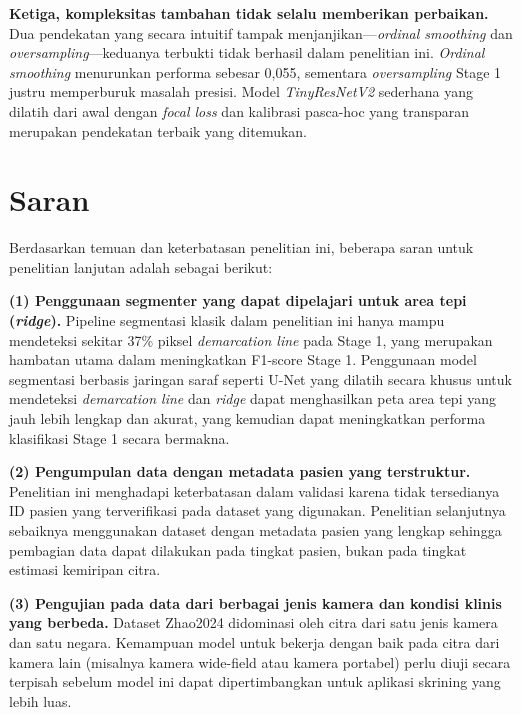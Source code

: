 \textbf{Ketiga, kompleksitas tambahan tidak selalu memberikan perbaikan.} Dua pendekatan
yang secara intuitif tampak menjanjikan---\textit{ordinal smoothing} dan \textit{oversampling}---keduanya
terbukti tidak berhasil dalam penelitian ini. \textit{Ordinal smoothing} menurunkan performa
sebesar 0,055, sementara \textit{oversampling} Stage 1 justru memperburuk masalah presisi.
Model \textit{TinyResNetV2} sederhana yang dilatih dari awal dengan \textit{focal loss} dan
kalibrasi pasca-hoc yang transparan merupakan pendekatan terbaik yang ditemukan.

\section{Saran}

Berdasarkan temuan dan keterbatasan penelitian ini, beberapa saran untuk penelitian lanjutan
adalah sebagai berikut:

\textbf{(1) Penggunaan segmenter yang dapat dipelajari untuk area tepi (\textit{ridge}).}
Pipeline segmentasi klasik dalam penelitian ini hanya mampu mendeteksi sekitar 37\% piksel
\textit{demarcation line} pada Stage 1, yang merupakan hambatan utama dalam meningkatkan
F1-score Stage 1. Penggunaan model segmentasi berbasis jaringan saraf seperti U-Net
\citep{Ronneberger2015} yang dilatih secara khusus untuk mendeteksi \textit{demarcation line}
dan \textit{ridge} dapat menghasilkan peta area tepi yang jauh lebih lengkap dan akurat,
yang kemudian dapat meningkatkan performa klasifikasi Stage 1 secara bermakna.

\textbf{(2) Pengumpulan data dengan metadata pasien yang terstruktur.} Penelitian ini
menghadapi keterbatasan dalam validasi karena tidak tersedianya ID pasien yang terverifikasi
pada dataset yang digunakan. Penelitian selanjutnya sebaiknya menggunakan dataset dengan
metadata pasien yang lengkap sehingga pembagian data dapat dilakukan pada tingkat pasien,
bukan pada tingkat estimasi kemiripan citra.

\textbf{(3) Pengujian pada data dari berbagai jenis kamera dan kondisi klinis yang berbeda.}
Dataset Zhao2024 didominasi oleh citra dari satu jenis kamera dan satu negara. Kemampuan
model untuk bekerja dengan baik pada citra dari kamera lain (misalnya kamera wide-field atau
kamera portabel) perlu diuji secara terpisah sebelum model ini dapat dipertimbangkan untuk
aplikasi skrining yang lebih luas.

